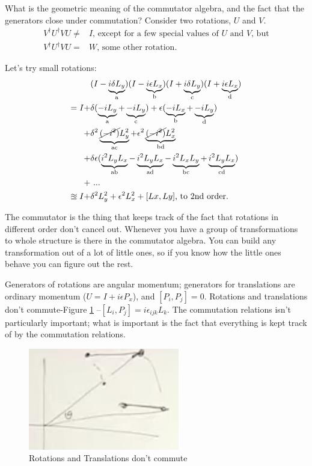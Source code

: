 \documentclass[]{article}
\begin{document}
What is the geometric meaning of the commutator algebra, and the fact that the generators close under commutation? Consider two rotations, $U$ and $V$.
\begin{align*}
	V^\dagger U^\dagger VU \ne& I \text{, except for a few special values of $U$ and $V$, but}\\
	V^\dagger U^\dagger VU =& W \text{, some other rotation.}
\end{align*}

Let's try small rotations:
\begin{align*}
	&(I-\underbrace{i\delta L_y}_\text{a}) (I-\underbrace{i\epsilon L_x}_\text{b}) (I+\underbrace{i\delta L_y}_\text{c}) (I+\underbrace{i\epsilon L_x}_\text{d})\\
	= I +& \delta (\underbrace{-i L_y}_\text{a} + \underbrace{-i L_y}_\text{c}) + \epsilon (\underbrace{-i L_x}_\text{b} + \underbrace{-i L_y}_\text{d}) \\
	+& \delta^2 \underbrace{\cancel{(-i^2)} L_y^2}_\text{ac} + \epsilon^2 \underbrace{\cancel{(-i^2)} L_x^2}_\text{bd}\\
	+& \delta \epsilon ( \underbrace{i^2 L_y L_x}_\text{ab}  - \underbrace{i^2 L_y L_x}_\text{ad} -\underbrace{i^2 L_x L_y}_\text{bc} + \underbrace{i^2 L_y L_x}_\text{cd})\\
	+& \text{ ...}\\
	\approxeq  I +& \delta^2 L_y^2 + \epsilon^2 L_x^2 +[Lx,Ly] \text{, to 2nd order.}
\end{align*}

The commutator is the thing that keeps track of the fact that rotations in different order don't cancel out. Whenever you have a group of transformations to whole structure is there in the commutator algebra. You can build any transformation out of a lot of little ones, so if you know how the little ones behave you can figure out the rest.

Generators of rotations are angular momentum; generators for translations are ordinary momentum ($U=I + i \epsilon P_x$), and $[P_i,P_j]=0$. Rotations and translations don't commute-Figure \ref{fig:particles3-4-rotation-translation-dont-commute} --$[L_i,P_j]=i \epsilon_{ijk} L_k$. The commutation relations isn't particularly important; what is important is the fact that everything is kept track of by the commutation relations.

\begin{figure}[H]
	\begin{center}
		\caption{Rotations and Translations don't commute}\label{fig:particles3-4-rotation-translation-dont-commute}
		\includegraphics{particles3-4-rotation-translation-dont-commute}
	\end{center}
\end{figure}
\end{document}
